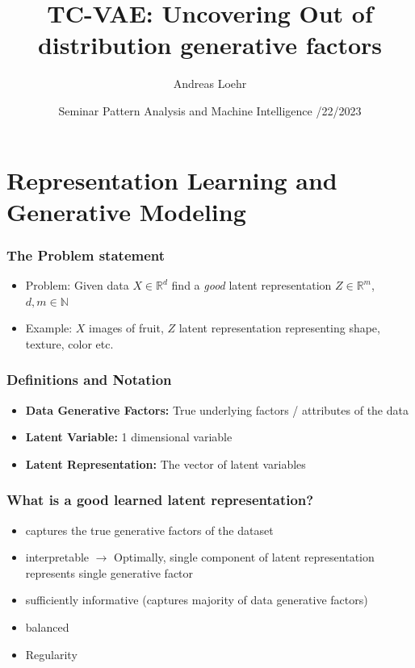 \documentclass{beamer}
\title[]{TC-VAE: Uncovering Out of distribution generative factors}
\author{Andreas Loehr}
\institute{Goethe Universität Frankfurt a.M.}
\date{
  \vspace{0.2cm}
  Seminar Pattern Analysis and Machine Intelligence
  \vspace{0.4cm}
  \newline 06/22/2023\\
  \vspace{0.3cm} %
  }
\theoremstyle{definition}
\begin{document}
  \AtBeginSection[]
  {
      \begin{frame}
          \tableofcontents[currentsection]
      \end{frame}
    }
  \begin{frame}
    \begin{titlepage}
    \end{titlepage}
  \end{frame}

  \section{Representation Learning and Generative Modeling}
    \begin{frame}
      \frametitle{The Problem statement}
      \begin{itemize}
        \item Problem: Given data $X \in \mathbb{R}^{d}$ find a \textit{good} latent representation $Z \in \mathbb{R}^{m}$, $d, m \in \mathbb{N}$
        \item Example: $X$ images of fruit, $Z$ latent representation representing shape, texture, color etc.
        \end{itemize}
      \end{frame}

      \begin{frame}
        \frametitle{Definitions and Notation}
        \begin{itemize}
          \item \textbf{Data Generative Factors:} True underlying factors / attributes of the data
          \item \textbf{Latent Variable:} 1 dimensional variable
          \item \textbf{Latent Representation:} The vector of latent variables
        \end{itemize}
      \end{frame}

    \begin{frame}
      \frametitle{What is a good learned latent representation?}
      \begin{itemize}
        \item captures the true generative factors of the dataset
        \item interpretable
              $\rightarrow$ Optimally, single component of latent representation represents single generative factor
        \item sufficiently informative (captures majority of data generative factors)
        \item balanced
        \item Regularity
      \end{itemize}
    \end{frame}
\end{document}
